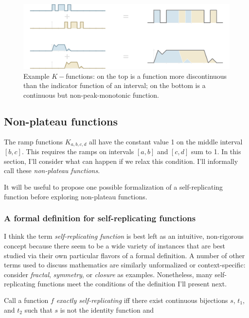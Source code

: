 \documentclass[]{article}
\begin{document}
\begin{figure}[htbp]
\centering
\includegraphics{images/pdfs/other_ramps2.pdf}
\caption{\label{fig:other_ramps}Example \(K-\)functions: on the top is a
function more discontinuous than the indicator function of an interval;
on the bottom is a continuous but non-peak-monotonic
function.}\label{fig:otherux5framps}
\end{figure}

\subsection{Non-plateau functions}\label{non-plateau-functions}

The ramp functions \(K_{a,b,c,d}\) all have the constant value 1 on the
middle interval \([b, c]\). This requires the ramps on intervals
\([a, b]\) and \([c, d]\) sum to 1. In this section, I'll consider what
can happen if we relax this condition. I'll informally call these
\emph{non-plateau functions}.

It will be useful to propose one possible formalization of a
self-replicating function before exploring non-plateau functions.

\subsubsection{A formal definition for self-replicating
functions}\label{a-formal-definition-for-self-replicating-functions}

I think the term \emph{self-replicating function} is best left as an
intuitive, non-rigorous concept because there seem to be a wide variety
of instances that are best studied via their own particular flavors of a
formal definition. A number of other terms used to discuss mathematics
are similarly unformalized or context-specific: consider \emph{fractal},
\emph{symmetry}, or \emph{closure} as examples. Nonetheless, many
self-replicating functions meet the conditions of the definition I'll
present next.

Call a function \(f\) \emph{exactly self-replicating} iff there exist
continuous bijections \(s\), \(t_1\), and \(t_2\) such that \(s\) is not
the identity function and
\end{document}

